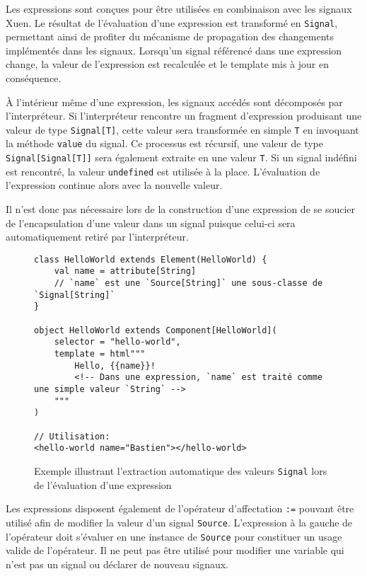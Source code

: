 Les expressions sont conçues pour être utilisées en combinaison avec les signaux Xuen. Le résultat de l'évaluation d'une expression est transformé en \texttt{Signal}, permettant ainsi de profiter du mécanisme de propagation des changements implémentés dans les signaux. Lorsqu'un signal référencé dans une expression change, la valeur de l'expression est recalculée et le template mis à jour en conséquence.

À l'intérieur même d'une expression, les signaux accédés sont décomposés par l'interpréteur. Si l'interpréteur rencontre un fragment d'expression produisant une valeur de type \texttt{Signal[T]}, cette valeur sera transformée en simple \texttt{T} en invoquant la méthode \texttt{value} du signal. Ce processus est récursif, une valeur de type \texttt{Signal[Signal[T]]} sera également extraite en une valeur \texttt{T}. Si un signal indéfini est rencontré, la valeur \texttt{undefined} est utilisée à la place. L'évaluation de l'expression continue alors avec la nouvelle valeur.

Il n'est donc pas nécessaire lors de la construction d'une expression de se soucier de l'encapsulation d'une valeur dans un signal puisque celui-ci sera automatiquement retiré par l'interpréteur.

\begin{figure}[h]
	\begin{lstlisting}
class HelloWorld extends Element(HelloWorld) {
	val name = attribute[String]
	// `name` est une `Source[String]` une sous-classe de `Signal[String]`
}

object HelloWorld extends Component[HelloWorld](
	selector = "hello-world",
	template = html"""
		Hello, {{name}}!
		<!-- Dans une expression, `name` est traité comme une simple valeur `String` -->
	"""
)

// Utilisation:
<hello-world name="Bastien"></hello-world>
	\end{lstlisting}
	\caption{Exemple illustrant l'extraction automatique des valeurs \texttt{Signal} lors de l'évaluation d'une expression}
\end{figure}

Les expressions disposent également de l'opérateur d'affectation \texttt{:=} pouvant être utilisé afin de modifier la valeur d'un signal \texttt{Source}. L'expression à la gauche de l'opérateur doit s'évaluer en une instance de \texttt{Source} pour constituer un usage valide de l'opérateur. Il ne peut pas être utilisé pour modifier une variable qui n'est pas un signal ou déclarer de nouveau signaux.

